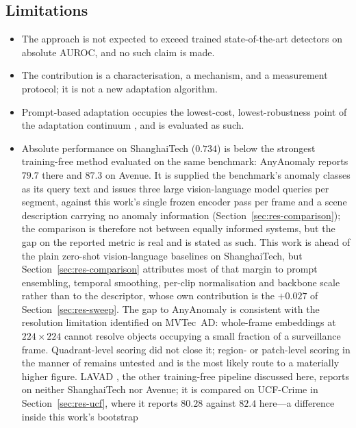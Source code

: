 \documentclass[a4paper,fleqn]{cas-sc}
\begin{document}
\subsection{Limitations}
\begin{itemize}
  \item The approach is not expected to exceed trained state-of-the-art detectors
        on absolute AUROC, and no such claim is made.
  \item The contribution is a characterisation, a mechanism, and a measurement
        protocol; it is not a new adaptation algorithm.
  \item Prompt-based adaptation occupies the lowest-cost, lowest-robustness point
        of the adaptation continuum \citep{fan2026llm}, and is evaluated as such.
  \item Absolute performance on ShanghaiTech ($0.734$) is below the strongest
        training-free method evaluated on the same benchmark: AnyAnomaly
        \citep{anyanomaly2025} reports $79.7$ there and $87.3$ on Avenue. It is
        supplied the benchmark's anomaly classes as its query text and issues
        three large vision-language model queries per segment, against this
        work's single frozen encoder pass per frame and a scene description
        carrying no anomaly information (Section~\ref{sec:res-comparison}); the
        comparison is therefore not between equally informed systems, but the
        gap on the reported metric is real and is stated as such. This work is
        ahead of the plain zero-shot vision-language baselines on ShanghaiTech,
        but Section~\ref{sec:res-comparison} attributes most of that margin to
        prompt ensembling, temporal smoothing, per-clip normalisation and
        backbone scale rather than to the descriptor, whose own contribution is
        the $+0.027$ of Section~\ref{sec:res-sweep}. The gap to AnyAnomaly is
        consistent with the
        resolution limitation identified on MVTec~AD: whole-frame embeddings at
        $224\times224$ cannot resolve objects occupying a small fraction of a
        surveillance frame. Quadrant-level scoring did not close it; region- or
        patch-level scoring in the manner of \citet{jeong2023winclip} remains
        untested and is the most likely route to a materially higher figure.
        LAVAD \citep{zanella2024lavad}, the other training-free pipeline
        discussed here, reports on neither ShanghaiTech nor Avenue; it is
        compared on UCF-Crime in Section~\ref{sec:res-ucf}, where it reports
        $80.28$ against $82.4$ here---a difference inside this work's bootstrap

\end{itemize}
\end{document}
